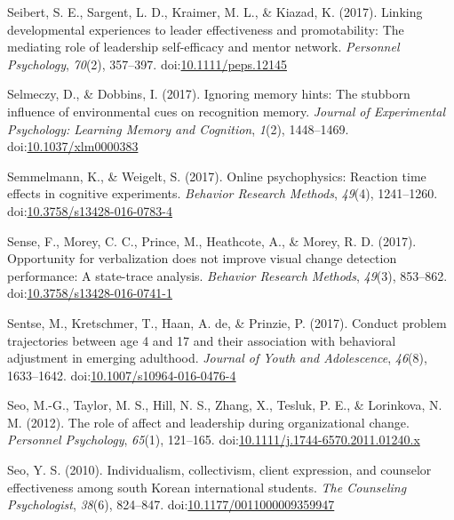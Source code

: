 \documentclass[english,man]{apa6}
\theoremstyle{definition}
\theoremstyle{definition}
\theoremstyle{definition}
\theoremstyle{remark}
\begin{document}
\hypertarget{ref-Seibert2017}{}
Seibert, S. E., Sargent, L. D., Kraimer, M. L., \& Kiazad, K. (2017).
Linking developmental experiences to leader effectiveness and
promotability: The mediating role of leadership self-efficacy and mentor
network. \emph{Personnel Psychology}, \emph{70}(2), 357--397.
doi:\href{https://doi.org/10.1111/peps.12145}{10.1111/peps.12145}

\hypertarget{ref-Selmeczy2017}{}
Selmeczy, D., \& Dobbins, I. (2017). Ignoring memory hints: The stubborn
influence of environmental cues on recognition memory. \emph{Journal of
Experimental Psychology: Learning Memory and Cognition}, \emph{1}(2),
1448--1469.
doi:\href{https://doi.org/10.1037/xlm0000383}{10.1037/xlm0000383}

\hypertarget{ref-Semmelmann2017}{}
Semmelmann, K., \& Weigelt, S. (2017). Online psychophysics: Reaction
time effects in cognitive experiments. \emph{Behavior Research Methods},
\emph{49}(4), 1241--1260.
doi:\href{https://doi.org/10.3758/s13428-016-0783-4}{10.3758/s13428-016-0783-4}

\hypertarget{ref-Sense2013}{}
Sense, F., Morey, C. C., Prince, M., Heathcote, A., \& Morey, R. D.
(2017). Opportunity for verbalization does not improve visual change
detection performance: A state-trace analysis. \emph{Behavior Research
Methods}, \emph{49}(3), 853--862.
doi:\href{https://doi.org/10.3758/s13428-016-0741-1}{10.3758/s13428-016-0741-1}

\hypertarget{ref-Sentse2017}{}
Sentse, M., Kretschmer, T., Haan, A. de, \& Prinzie, P. (2017). Conduct
problem trajectories between age 4 and 17 and their association with
behavioral adjustment in emerging adulthood. \emph{Journal of Youth and
Adolescence}, \emph{46}(8), 1633--1642.
doi:\href{https://doi.org/10.1007/s10964-016-0476-4}{10.1007/s10964-016-0476-4}

\hypertarget{ref-Seo2012}{}
Seo, M.-G., Taylor, M. S., Hill, N. S., Zhang, X., Tesluk, P. E., \&
Lorinkova, N. M. (2012). The role of affect and leadership during
organizational change. \emph{Personnel Psychology}, \emph{65}(1),
121--165.
doi:\href{https://doi.org/10.1111/j.1744-6570.2011.01240.x}{10.1111/j.1744-6570.2011.01240.x}

\hypertarget{ref-Seo2010}{}
Seo, Y. S. (2010). Individualism, collectivism, client expression, and
counselor effectiveness among south Korean international students.
\emph{The Counseling Psychologist}, \emph{38}(6), 824--847.
doi:\href{https://doi.org/10.1177/0011000009359947}{10.1177/0011000009359947}
\end{document}
